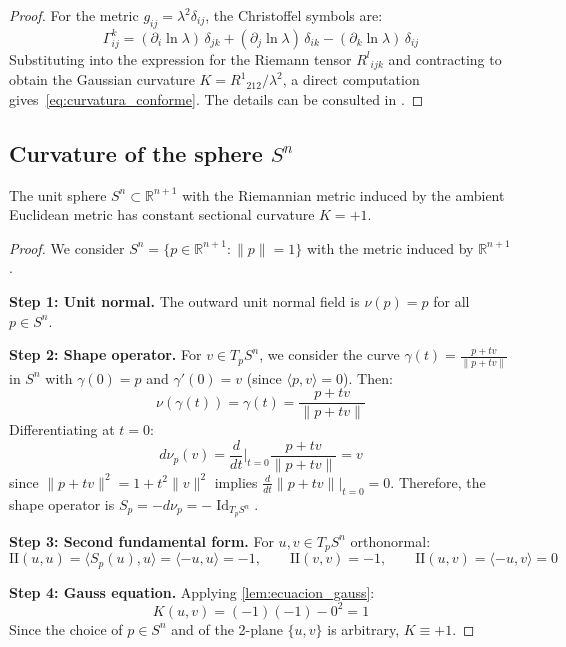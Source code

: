 \begin{proof}
For the metric $g_{ij} = \lambda^2 \delta_{ij}$, the Christoffel symbols are:
\[
\Gamma^k_{ij} = (\partial_i \ln\lambda)\,\delta_{jk} + (\partial_j \ln\lambda)\,\delta_{ik} - (\partial_k \ln\lambda)\,\delta_{ij}
\]
Substituting into the expression for the Riemann tensor $R^l{}_{ijk}$ and contracting to obtain the Gaussian curvature $K = R^1{}_{212}/\lambda^2$, a direct computation gives~\eqref{eq:curvatura_conforme}. The details can be consulted in \citet[Proposition~8.32]{lee2018introduction}.
\end{proof}

\subsection{Curvature of the sphere \texorpdfstring{$S^n$}{Sn}}\label{subsec:curvatura_esfera}

\begin{theorem}\label{thm:curvatura_esfera}
The unit sphere $S^n \subset \mathbb{R}^{n+1}$ with the Riemannian metric induced by the ambient Euclidean metric has constant sectional curvature $K = +1$.
\end{theorem}

\begin{proof}
We consider $S^n = \{p \in \mathbb{R}^{n+1} : \|p\| = 1\}$ with the metric induced by $\mathbb{R}^{n+1}$.

\textbf{Step 1: Unit normal.}
The outward unit normal field is $\nu(p) = p$ for all $p \in S^n$.

\textbf{Step 2: Shape operator.}
For $v \in T_pS^n$, we consider the curve $\gamma(t) = \frac{p + tv}{\|p + tv\|}$ in $S^n$ with $\gamma(0) = p$ and $\gamma'(0) = v$ (since $\langle p, v \rangle = 0$). Then:
\[
\nu(\gamma(t)) = \gamma(t) = \frac{p + tv}{\|p + tv\|}
\]
Differentiating at $t = 0$:
\[
d\nu_p(v) = \frac{d}{dt}\bigg|_{t=0} \frac{p + tv}{\|p + tv\|} = v
\]
since $\|p + tv\|^2 = 1 + t^2\|v\|^2$ implies $\frac{d}{dt}\|p+tv\|\big|_{t=0} = 0$. Therefore, the shape operator is $S_p = -d\nu_p = -\operatorname{Id}_{T_pS^n}$.

\textbf{Step 3: Second fundamental form.}
For $u, v \in T_pS^n$ orthonormal:
\[
\mathrm{II}(u,u) = \langle S_p(u), u \rangle = \langle -u, u \rangle = -1, \qquad \mathrm{II}(v,v) = -1, \qquad \mathrm{II}(u,v) = \langle -u, v \rangle = 0
\]

\textbf{Step 4: Gauss equation.}
Applying \autoref{lem:ecuacion_gauss}:
\[
K(u,v) = (-1)(-1) - 0^2 = 1
\]
Since the choice of $p \in S^n$ and of the 2-plane $\{u,v\}$ is arbitrary, $K \equiv +1$.
\end{proof}


